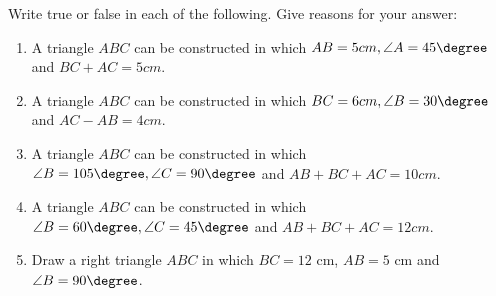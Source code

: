 Write true or false in each of the following. Give reasons for your answer:
\begin{enumerate}[label=\thesubsection.\arabic*,ref=\thesubsection.\theenumi,resume*]
\item A triangle $ABC$ can be constructed in which $AB = 5cm, \angle A =45\degree$ and $BC + AC = 5cm$.
\item A triangle $ABC$ can be constructed in which $BC = 6cm, \angle B =30\degree$ and $AC - AB=4cm$.
\item A triangle $ABC$ can be constructed in which $\angle B =105\degree,\angle C =90\degree$ and $AB + BC + AC = 10cm$.        
\item A triangle $ABC$ can be constructed in which $\angle B =60\degree, \angle C =45 \degree$ and $AB + BC + AC = 12cm$.           
\item Draw a right triangle ${ABC}$ in which $BC=12$ cm, $AB=5$ cm and $\angle{B}=90\degree$.
\end{enumerate}
